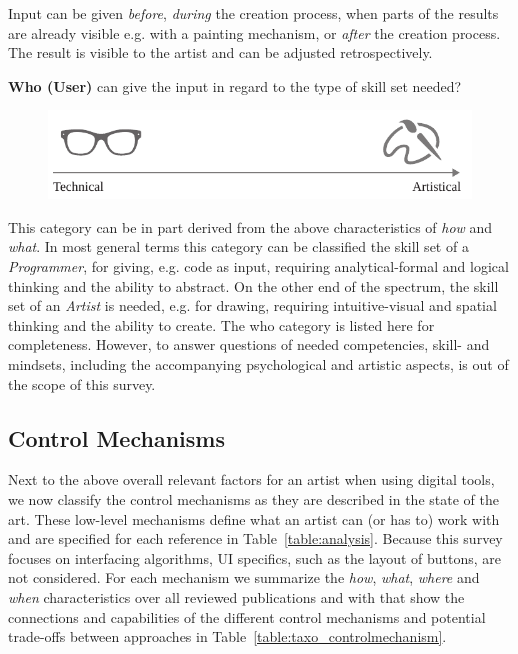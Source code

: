 Input can be given \textit{before}, \textit{during} the creation process, when parts of the results are already visible e.g. with a painting mechanism, or \textit{after} the creation process. The result is visible to the artist and can be adjusted retrospectively.


\noindent\textbf{Who (User)} can give the input in regard to the type of skill set needed? 
\begin{figure}[H]
    \centering
        \includegraphics[width=\controlParamsFigWidth\linewidth]{figures/control_paradigms/who.pdf}
\end{figure}

This category can be in part derived from the above characteristics of \textit{how} and \textit{what}. In most general terms this category can be classified the skill set of a \textit{Programmer}, for giving, e.g. code as input, requiring analytical-formal and logical thinking and the ability to abstract. On the other end of the spectrum, the skill set of an \textit{Artist} is needed, e.g. for drawing, requiring intuitive-visual and spatial thinking and the ability to create.
The who category is listed here for completeness. However, to answer questions of needed competencies, skill- and mindsets, including the accompanying psychological and artistic aspects, is out of the scope of this survey.


\subsection{Control Mechanisms}
\label{subsec:taxo_control_mechanism}


Next to the above overall relevant factors for an artist when using digital tools, we now classify the control mechanisms as they are described in the state of the art. These low-level mechanisms define what an artist can (or has to) work with and are specified for each reference in Table~\ref{table:analysis}. Because this survey focuses on interfacing algorithms, UI specifics, such as the layout of buttons, are not considered. For each mechanism we summarize the \textit{how}, \textit{what}, \textit{where} and \textit{when} characteristics over all reviewed publications and with that show the connections and capabilities of the different control mechanisms and potential trade-offs between approaches in Table~\ref{table:taxo_controlmechanism}.


